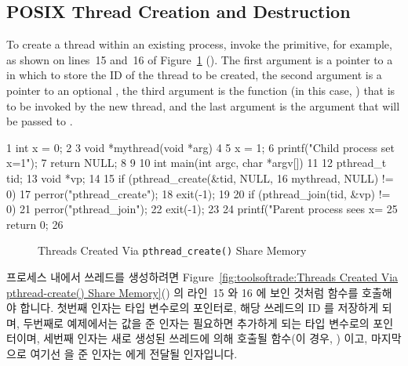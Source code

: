 \subsection{POSIX Thread Creation and Destruction}
\label{sec:toolsoftrade:POSIX Thread Creation and Destruction}

To create a thread within an existing process, invoke the
 primitive, for example, as shown on lines~15
and~16 of
Figure~\ref{fig:toolsoftrade:Threads Created Via pthread-create() Share Memory}
().
The first argument is a pointer to a  in which to store the
ID of the thread to be created, the second  argument is a pointer
to an optional , the third argument is the function
(in this case, )
that is to be invoked by the new thread, and the last  argument
is the argument that will be passed to .

{ \scriptsize
\begin{verbbox}
  1 int x = 0;
  2 
  3 void *mythread(void *arg)
  4 {
  5   x = 1;
  6   printf("Child process set x=1\n");
  7   return NULL;
  8 }
  9 
 10 int main(int argc, char *argv[])
 11 {
 12   pthread_t tid;
 13   void *vp;
 14 
 15   if (pthread_create(&tid, NULL,
 16                      mythread, NULL) != 0) {
 17     perror("pthread_create");
 18     exit(-1);
 19   }
 20   if (pthread_join(tid, &vp) != 0) {
 21     perror("pthread_join");
 22     exit(-1);
 23   }
 24   printf("Parent process sees x=%
 25   return 0;
 26 }
\end{verbbox}
}
\begin{figure}[tbp]
\centering
\theverbbox
\caption{Threads Created Via {\tt pthread\_create()} Share Memory}
\label{fig:toolsoftrade:Threads Created Via pthread-create() Share Memory}
\end{figure}

프로세스 내에서 쓰레드를 생성하려면 Figure~\ref{fig:toolsoftrade:Threads
Created Via pthread-create() Share Memory}() 의 라인~15 와 16 에
보인 것처럼  함수를 호출해야 합니다.
첫번째 인자는  타입 변수로의 포인터로, 해당 쓰레드의 ID 를
저장하게 되며, 두번째로 예제에서는  값을 준 인자는 필요하면 추가하게
되는  타입 변수로의 포인터이며, 세번째 인자는 새로 생성된
쓰레드에 의해 호출될 함수(이 경우, ) 이고, 마지막으로 여기선
 을 준 인자는  에게 전달될 인자입니다.

